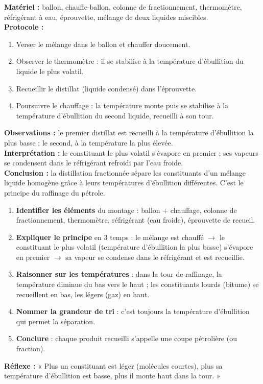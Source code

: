 \documentclass[11pt]{article}
\newcommand{\cle}[1]{{\popxbold\color{popdark}#1}}
\begin{document}
\begin{experience}
\textbf{Matériel :} ballon, chauffe-ballon, colonne de fractionnement, thermomètre, réfrigérant à eau, éprouvette, mélange de deux liquides miscibles. \\
\textbf{Protocole :}
\begin{enumerate}
\item Verser le mélange dans le ballon et chauffer doucement.
\item Observer le thermomètre : il se stabilise à la température d'ébullition du liquide le plus volatil.
\item Recueillir le distillat (liquide condensé) dans l'éprouvette.
\item Poursuivre le chauffage : la température monte puis se stabilise à la température d'ébullition du second liquide, recueilli à son tour.
\end{enumerate}
\textbf{Observations :} le premier distillat est recueilli à la température d'ébullition la plus basse ; le second, à la température la plus élevée. \\
\textbf{Interprétation :} le constituant le plus volatil s'évapore en premier ; ses vapeurs se condensent dans le réfrigérant refroidi par l'eau froide. \\
\textbf{Conclusion :} la distillation fractionnée sépare les constituants d'un mélange liquide homogène grâce à leurs \cle{températures d'ébullition} différentes. C'est le principe du raffinage du pétrole.
\end{experience}

\begin{methode}
\begin{enumerate}
\item \textbf{Identifier les éléments} du montage : ballon + chauffage, colonne de fractionnement, thermomètre, réfrigérant (eau froide), éprouvette de recueil.
\item \textbf{Expliquer le principe} en 3 temps : le mélange est chauffé $\rightarrow$ le constituant le plus volatil (température d'ébullition la plus basse) s'évapore en premier $\rightarrow$ sa vapeur se condense dans le réfrigérant et est recueillie.
\item \textbf{Raisonner sur les températures} : dans la tour de raffinage, la température diminue du bas vers le haut ; les constituants lourds (bitume) se recueillent en bas, les légers (gaz) en haut.
\item \textbf{Nommer la grandeur de tri} : c'est toujours la \cle{température d'ébullition} qui permet la séparation.
\item \textbf{Conclure} : chaque produit recueilli s'appelle une \cle{coupe pétrolière} (ou fraction).
\end{enumerate}
\textbf{Réflexe :} « Plus un constituant est léger (molécules courtes), plus sa température d'ébullition est basse, plus il monte haut dans la tour. »
\end{methode}
\end{document}
